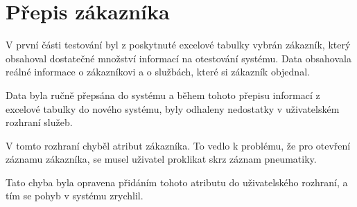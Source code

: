 \section{Přepis zákazníka}
V první části testování byl z poskytnuté excelové tabulky vybrán zákazník, který obsahoval dostatečné množství informací na otestování systému. Data obsahovala reálné informace o zákazníkovi a o službách, které si zákazník objednal. 

Data byla ručně přepsána do systému a během tohoto přepisu informací z excelové tabulky do nového systému, byly odhaleny nedostatky v uživatelském rozhraní služeb.

V tomto rozhraní chyběl atribut zákazníka. To vedlo k problému, že pro otevření záznamu zákazníka, se musel uživatel proklikat skrz záznam pneumatiky.

Tato chyba byla opravena přidáním tohoto atributu do uživatelského rozhraní, a tím se pohyb v systému zrychlil.
